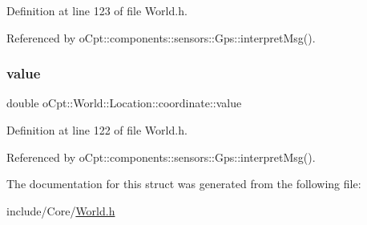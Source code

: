 Definition at line 123 of file World.\+h.



Referenced by o\+Cpt\+::components\+::sensors\+::\+Gps\+::interpret\+Msg().

\hypertarget{structo_cpt_1_1_world_1_1_location_1_1coordinate_adc08e8df0bc1335c3e82ba22c20e5f2a}{}\label{structo_cpt_1_1_world_1_1_location_1_1coordinate_adc08e8df0bc1335c3e82ba22c20e5f2a} 
\subsubsection{\texorpdfstring{value}{value}}
{\footnotesize\ttfamily double o\+Cpt\+::\+World\+::\+Location\+::coordinate\+::value}



Definition at line 122 of file World.\+h.



Referenced by o\+Cpt\+::components\+::sensors\+::\+Gps\+::interpret\+Msg().



The documentation for this struct was generated from the following file\+:\begin{DoxyCompactItemize}
\item 
include/\+Core/\hyperlink{_world_8h}{World.\+h}\end{DoxyCompactItemize}
